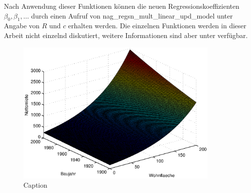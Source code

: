 Nach Anwendung dieser Funktionen können die neuen Regressionskoeffizienten $\beta_0, \beta_1, \dots$ durch einen Aufruf von nag\_regsn\_mult\_linear\_upd\_model unter Angabe von $R$ und $c$ erhalten werden.
Die einzelnen Funktionen werden in dieser Arbeit nicht einzelnd diskutiert, weitere Informationen sind aber unter \citep{nag:contents} verfügbar.


\begin{figure}[t]
  \centering
  \includegraphics[width=10cm]{figures/nm_wfl_bj_log_approach}
  \caption{Caption}
  \label{fig:3d_result}
\end{figure}







